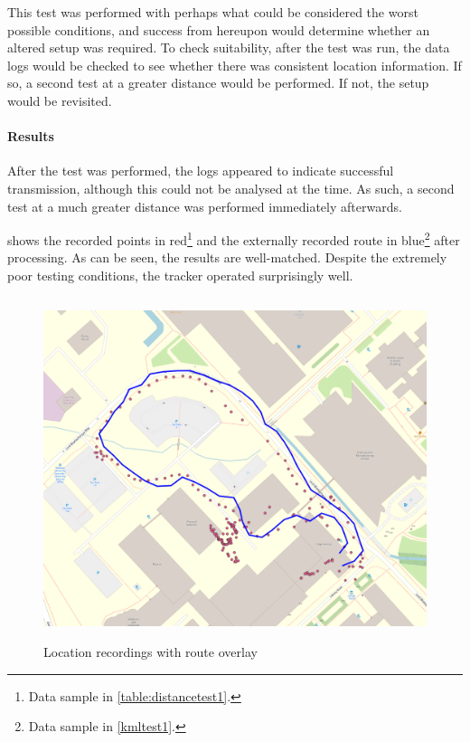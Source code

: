 This test was performed with perhaps what could be considered the worst possible conditions,
and success from hereupon would determine whether an altered setup was required. To check suitability,
after the test was run, the data logs would be checked to see whether there was consistent location
information. If so, a second test at a greater distance would be performed. If not, the
setup would be revisited.

\paragraph{Results}
After the test was performed, the logs appeared to indicate successful transmission, although
this could not be analysed at the time. As such, a second test at a much greater distance was
performed immediately afterwards.

 shows the recorded points in red\footnote{
    Data sample in \cref{table:distancetest1}.
} and the externally recorded route in blue\footnote{
    Data sample in \cref{kmltest1}.
}
after processing. As can be seen, the results are well-matched. Despite the extremely poor
testing conditions, the tracker operated surprisingly well.

\begin{figure}[htbp]
    \centering
    \includegraphics[height=10cm]{../figures/maps/test1 overlay.png}
    \caption[Distance test one overlay]{Location recordings with route overlay}
    \label{fig:dtest1}
\end{figure}


